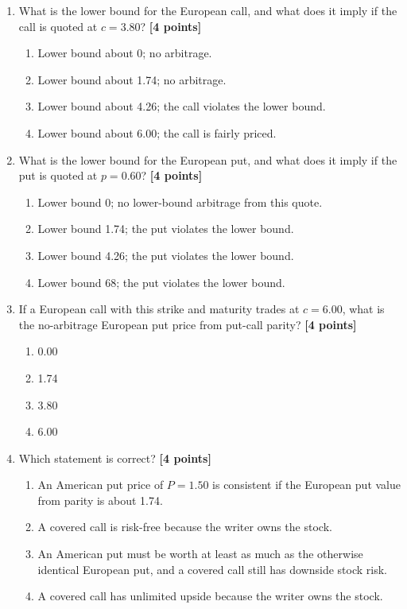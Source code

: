 \documentclass[11pt]{article}
\newcommand{\pts}[1]{\hspace{0.35em}\textnormal{\textbf{[#1 points]}}}
\newenvironment{choices}{\begin{enumerate}[label=\Alph*.,leftmargin=2.2em,itemsep=0.12em,topsep=0.12em]}{\end{enumerate}}
\begin{document}
\begin{enumerate}
    \item What is the lower bound for the European call, and what does it imply
    if the call is quoted at $c=3.80$? \pts{4}
    \begin{choices}
        \item Lower bound about 0; no arbitrage.
        \item Lower bound about 1.74; no arbitrage.
        \item Lower bound about 4.26; the call violates the lower bound.
        \item Lower bound about 6.00; the call is fairly priced.
    \end{choices}

    \item What is the lower bound for the European put, and what does it imply
    if the put is quoted at $p=0.60$? \pts{4}
    \begin{choices}
        \item Lower bound 0; no lower-bound arbitrage from this quote.
        \item Lower bound 1.74; the put violates the lower bound.
        \item Lower bound 4.26; the put violates the lower bound.
        \item Lower bound 68; the put violates the lower bound.
    \end{choices}

    \item If a European call with this strike and maturity trades at $c=6.00$,
    what is the no-arbitrage European put price from put-call parity? \pts{4}
    \begin{choices}
        \item 0.00
        \item 1.74
        \item 3.80
        \item 6.00
    \end{choices}

    \item Which statement is correct? \pts{4}
    \begin{choices}
        \item An American put price of $P=1.50$ is consistent if the European put
        value from parity is about 1.74.
        \item A covered call is risk-free because the writer owns the stock.
        \item An American put must be worth at least as much as the otherwise
        identical European put, and a covered call still has downside stock risk.
        \item A covered call has unlimited upside because the writer owns the stock.
    \end{choices}
\end{enumerate}
\end{document}
